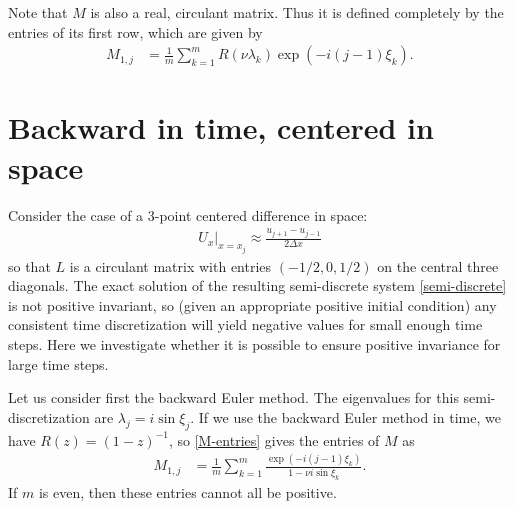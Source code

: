 \documentclass[a4paper]{article}
\newcommand{\dx}{\Delta x}
\begin{document}
Note that $M$ is also a real, circulant matrix.
Thus it is defined completely by the entries of its first row, which
are given by
\begin{align} \label{M-entries}
    M_{1,j} & = \frac{1}{m} \sum_{k=1}^m R(\nu\lambda_k) \exp(-i(j-1)\xi_k).
\end{align}

\section{Backward in time, centered in space}
Consider the case of a 3-point centered difference in space:
\begin{align}
    U_x|_{x=x_j} \approx \frac{u_{j+1}-u_{j-1}}{2\dx}
\end{align}
so that $L$ is a circulant matrix with entries $(-1/2, 0, 1/2)$ on the central
three diagonals.  The exact solution of the resulting semi-discrete
system \eqref{semi-discrete} is not positive invariant, so (given an appropriate
positive initial condition) any consistent time discretization will yield
negative values for small enough time steps.  Here we investigate whether
it is possible to ensure positive invariance for large time steps.

Let us consider first the backward Euler method.
The eigenvalues for this semi-discretization are $\lambda_j = i\sin\xi_j$.
If we use the backward Euler method in time, we have $R(z) = (1-z)^{-1}$, so
\eqref{M-entries} gives the entries of $M$ as
\begin{align} \label{firstrow}
    M_{1,j} & = \frac{1}{m} \sum_{k=1}^m \frac{\exp\left(-i(j-1)\xi_k\right)}{1-\nu i \sin\xi_k}.
\end{align}
If $m$ is even, then these entries cannot all be positive.
\end{document}
